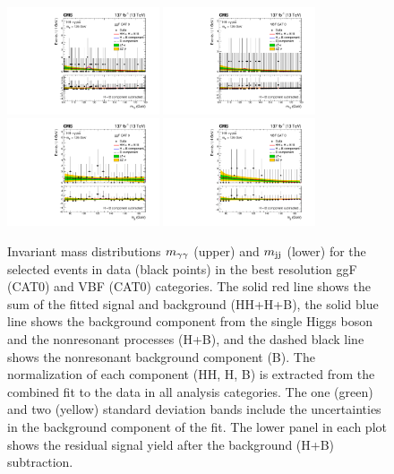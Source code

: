 \documentclass[11pt,twoside,a4paper,cmspaper,final,collab]{cms-tdr}
\begin{document}
\begin{figure}[htbp]
 \centering
\includegraphics[width=0.40\textwidth]{Figure_008-a.pdf}
\includegraphics[width=0.40\textwidth]{Figure_008-b.pdf}\\
\includegraphics[width=0.40\textwidth]{Figure_008-c.pdf}
\includegraphics[width=0.40\textwidth]{Figure_008-d.pdf}\\
  \caption{
Invariant mass distributions $m_{\gamma\gamma}$ (upper) and $m_\text{jj}$ (lower) for the selected events in data (black points) in the best resolution ggF (CAT0) and VBF (CAT0) categories. The solid red line shows the sum of the fitted signal and background (HH+H+B), the solid blue line shows the background component from the single Higgs boson and the nonresonant processes (H+B), and the dashed black line shows the nonresonant background component (B). The normalization of each component (HH, H, B) is extracted from the combined fit to the data in all analysis categories. The one (green) and two (yellow) standard
  deviation bands include the uncertainties in the background component
  of the fit. The lower panel in each plot shows the residual signal yield after the
 background (H+B) subtraction.}
 \label{fig:sigBkgPlotsvbf}
\end{figure}
\end{document}
